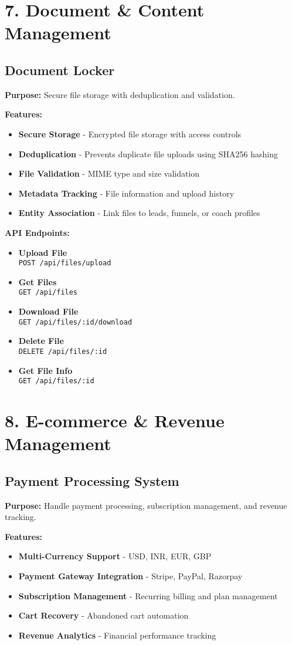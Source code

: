 \documentclass[12pt,a4paper]{article}
\newcommand{\apiendpoint}[2]{\textbf{#1} \\ \texttt{#2}}
\begin{document}
\section{7. Document \& Content Management}

\subsection{Document Locker}
\textbf{Purpose:} Secure file storage with deduplication and validation.

\textbf{Features:}
\begin{itemize}
    \item \textbf{Secure Storage} - Encrypted file storage with access controls
    \item \textbf{Deduplication} - Prevents duplicate file uploads using SHA256 hashing
    \item \textbf{File Validation} - MIME type and size validation
    \item \textbf{Metadata Tracking} - File information and upload history
    \item \textbf{Entity Association} - Link files to leads, funnels, or coach profiles
\end{itemize}

\textbf{API Endpoints:}
\begin{itemize}
    \item \apiendpoint{Upload File}{POST /api/files/upload}
    \item \apiendpoint{Get Files}{GET /api/files}
    \item \apiendpoint{Download File}{GET /api/files/:id/download}
    \item \apiendpoint{Delete File}{DELETE /api/files/:id}
    \item \apiendpoint{Get File Info}{GET /api/files/:id}
\end{itemize}

\section{8. E-commerce \& Revenue Management}

\subsection{Payment Processing System}
\textbf{Purpose:} Handle payment processing, subscription management, and revenue tracking.

\textbf{Features:}
\begin{itemize}
    \item \textbf{Multi-Currency Support} - USD, INR, EUR, GBP
    \item \textbf{Payment Gateway Integration} - Stripe, PayPal, Razorpay
    \item \textbf{Subscription Management} - Recurring billing and plan management
    \item \textbf{Cart Recovery} - Abandoned cart automation
    \item \textbf{Revenue Analytics} - Financial performance tracking
\end{itemize}
\end{document}
